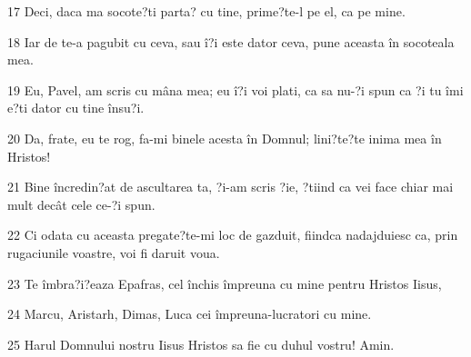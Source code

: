 \par 17 Deci, daca ma socote?ti parta? cu tine, prime?te-l pe el, ca pe mine.
\par 18 Iar de te-a pagubit cu ceva, sau î?i este dator ceva, pune aceasta în socoteala mea.
\par 19 Eu, Pavel, am scris cu mâna mea; eu î?i voi plati, ca sa nu-?i spun ca ?i tu îmi e?ti dator cu tine însu?i.
\par 20 Da, frate, eu te rog, fa-mi binele acesta în Domnul; lini?te?te inima mea în Hristos!
\par 21 Bine încredin?at de ascultarea ta, ?i-am scris ?ie, ?tiind ca vei face chiar mai mult decât cele ce-?i spun.
\par 22 Ci odata cu aceasta pregate?te-mi loc de gazduit, fiindca nadajduiesc ca, prin rugaciunile voastre, voi fi daruit voua.
\par 23 Te îmbra?i?eaza Epafras, cel închis împreuna cu mine pentru Hristos Iisus,
\par 24 Marcu, Aristarh, Dimas, Luca cei împreuna-lucratori cu mine.
\par 25 Harul Domnului nostru Iisus Hristos sa fie cu duhul vostru! Amin.


